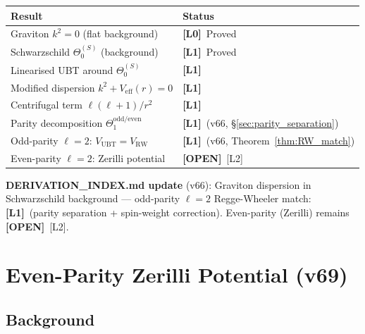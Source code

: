 \documentclass[12pt]{article}
\theoremstyle{definition}
\theoremstyle{remark}
\newcommand{\Lzero}{\textbf{[L0]}}
\newcommand{\Lone}{\textbf{[L1]}}
\newcommand{\OPEN}{\textbf{[OPEN]}}
\begin{document}
\begin{center}
\begin{tabular}{|l|l|}
\hline
\textbf{Result} & \textbf{Status} \\
\hline
Graviton $k^2=0$ (flat background) & \Lzero\ Proved \\
Schwarzschild $\Theta_0^{(S)}$ (background) & \Lone\ Proved \\
Linearised UBT around $\Theta_0^{(S)}$ & \Lone \\
Modified dispersion $k^2+V_{\text{eff}}(r)=0$ & \Lone \\
Centrifugal term $\ell(\ell+1)/r^2$ & \Lone \\
Parity decomposition $\Theta_1^{\text{odd/even}}$ & \Lone\ (v66, §\ref{sec:parity_separation}) \\
Odd-parity $\ell=2$: $V_{\text{UBT}}=V_{\text{RW}}$ & \Lone\ (v66, Theorem~\ref{thm:RW_match}) \\
Even-parity $\ell=2$: Zerilli potential & \OPEN\ [L2] \\
\hline
\end{tabular}
\end{center}

\textbf{DERIVATION\_INDEX.md update} (v66):
Graviton dispersion in Schwarzschild background — odd-parity $\ell=2$
Regge-Wheeler match: \Lone\ (parity separation + spin-weight correction).
Even-parity (Zerilli) remains \OPEN\ [L2].

\section{Even-Parity Zerilli Potential (v69)}
\label{sec:zerilli_even_parity}


\subsection{Background}
\end{document}
